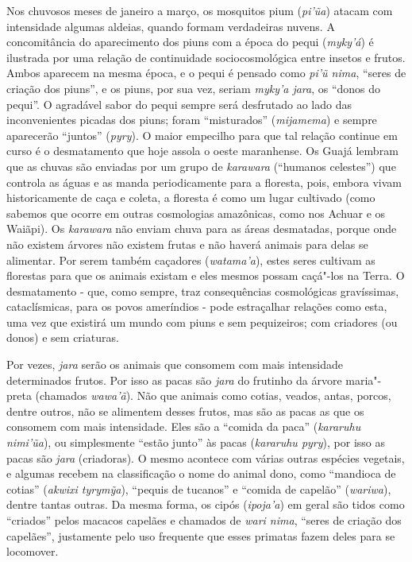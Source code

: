 Nos chuvosos meses de janeiro a março, os mosquitos pium (\emph{pi'ũa})
atacam com intensidade algumas aldeias, quando formam verdadeiras
nuvens. A concomitância do aparecimento dos piuns com a época do pequi
(\emph{myky'á}) é ilustrada por uma relação de continuidade
sociocosmológica entre insetos e frutos. Ambos aparecem na mesma época,
e o pequi é pensado como \emph{pi'ũ nima}, ``seres de criação dos piuns'',
e os piuns, por sua vez, seriam \emph{myky'a jara}, os ``donos do pequi''.
O agradável sabor do pequi sempre será desfrutado ao lado das
inconvenientes picadas dos piuns; foram ``misturados'' (\emph{mijamema}) e
sempre aparecerão ``juntos'' (\emph{pyry}). O maior empecilho para que tal
relação continue em curso é o desmatamento que hoje assola o oeste
maranhense. Os Guajá lembram que as chuvas são enviadas por um grupo de
\emph{karawara} (``humanos celestes'') que controla as águas e as manda
periodicamente para a floresta, pois, embora vivam historicamente de
caça e coleta, a floresta é como um lugar cultivado (como sabemos que
ocorre em outras cosmologias amazônicas, como nos Achuar e os Waiãpi).
Os \emph{karawara} não enviam chuva para as áreas desmatadas, porque
onde não existem árvores não existem frutas e não haverá animais para
delas se alimentar. Por serem também caçadores (\emph{watama'a}), estes
seres cultivam as florestas para que os animais existam e eles mesmos
possam caçá"-los na Terra. O desmatamento - que, como sempre, traz
consequências cosmológicas gravíssimas, cataclísmicas, para os povos
ameríndios - pode estraçalhar relações como esta, uma vez que existirá
um mundo com piuns e sem pequizeiros; com criadores (ou donos) e sem
criaturas.

Por vezes, \emph{jara} serão os animais que consomem com mais
intensidade determinados frutos. Por isso as pacas são \emph{jara} do
frutinho da árvore maria"-preta (chamados \emph{wawa'ã}). Não que animais
como cotias, veados, antas, porcos, dentre outros, não se alimentem
desses frutos, mas são as pacas as que os consomem com mais intensidade.
Eles são a ``comida da paca'' (\emph{kararuhu nimi'ũa}), ou simplesmente
``estão junto'' às pacas (\emph{kararuhu pyry}), por isso as pacas são
\emph{jara} (criadoras). O mesmo acontece com várias outras espécies
vegetais, e algumas recebem na classificação o nome do animal dono, como
``mandioca de cotias'' (\emph{akwixi tyrymỹa}), ``pequis de tucanos'' e
``comida de capelão'' (\emph{wariwa}), dentre tantas outras. Da mesma
forma, os cipós (\emph{ipoja'a}) em geral são tidos como ``criados'' pelos
macacos capelães e chamados de \emph{wari nima}, ``seres de criação dos
capelães'', justamente pelo uso frequente que esses primatas fazem deles
para se locomover.

